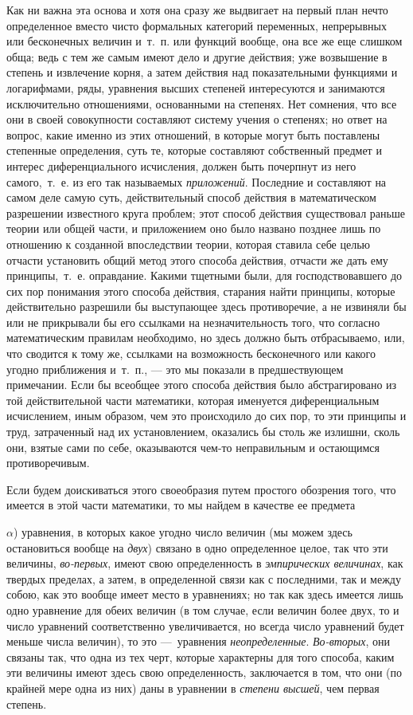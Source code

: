 {Как ни важна эта основа и хотя она сразу же выдвигает на первый план нечто
определенное вместо чисто формальных категорий переменных, непрерывных или
бесконечных величин и~т.~п. или функций вообще, она все же еще слишком
обща; ведь с тем же самым имеют дело и другие действия; уже возвышение в
степень и извлечение корня, а затем действия над показательными функциями и
логарифмами, ряды, уравнения высших степеней интересуются и занимаются
исключительно отношениями, основанными на степенях. Нет сомнения, что все
они в своей совокупности составляют систему учения о степенях; но ответ на
вопрос, какие именно из этих отношений, в которые могут быть поставлены
степенные определения, суть те, которые составляют собственный предмет и
интерес диференциального исчисления, должен быть почерпнут из него
самого,~т.~е. из его так называемых {\em приложений}.
Последние и составляют на самом деле самую суть, действительный способ
действия в математическом разрешении известного круга проблем; этот способ
действия существовал раньше теории или общей части, и приложением оно было
названо позднее лишь по отношению к созданной впоследствии теории, которая
ставила себе целью отчасти установить общий метод этого способа действия,
отчасти же дать ему принципы,~т.~е. оправдание. Какими тщетными были, для
господствовавшего до сих пор понимания этого способа действия, старания
найти принципы, которые действительно разрешили бы выступающее здесь
противоречие, а не извиняли бы или не прикрывали бы его ссылками на
незначительность того, что согласно математическим правилам необходимо, но
здесь должно быть отбрасываемо, или, что сводится к тому же, ссылками на
возможность бесконечного или какого угодно приближения и~т.~п., — это мы
показали в предшествующем примечании. Если бы всеобщее этого способа
действия было абстрагировано из той действительной части математики,
которая именуется диференциальным исчислением, иным образом, чем это
происходило до сих пор, то эти принципы и труд, затраченный над их
установлением, оказались бы столь же излишни, сколь они, взятые сами по
себе, оказываются чем-то неправильным и остающимся противоречивым.

Если будем доискиваться этого своеобразия путем простого обозрения того, что
имеется в этой части математики, то мы найдем в качестве ее предмета

$\alpha $) уравнения, в которых какое угодно число величин (мы можем здесь
остановиться вообще на {\em двух}) связано в одно
определенное целое, так что эти величины,
{\em во-первых}, имеют свою определенность в
{\em эмпирических величинах}, как твердых пределах, а
затем, в определенной связи как с последними, так и между собою, как это
вообще имеет место в уравнениях; но так как здесь имеется лишь одно
уравнение для обеих величин (в том случае, если величин более двух, то и
число уравнений соответственно увеличивается, но всегда число уравнений
будет меньше числа величин), то это —~уравнения
{\em неопределенные}.
{\em Во-вторых}, они связаны так, что одна из тех черт,
которые характерны для того способа, каким эти величины имеют здесь свою
определенность, заключается в том, что они (по крайней мере одна из них)
даны в уравнении в {\em степени высшей}, чем первая
степень.

}
